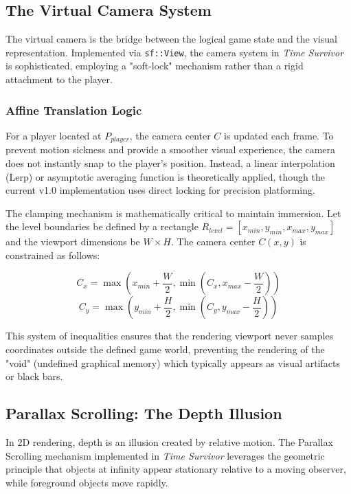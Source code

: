 \documentclass[10pt, a4paper]{article}
\begin{document}
\subsection{The Virtual Camera System}
The virtual camera is the bridge between the logical game state and the visual representation. Implemented via \texttt{sf::View}, the camera system in \textit{Time Survivor} is sophisticated, employing a "soft-lock" mechanism rather than a rigid attachment to the player.

\subsubsection{Affine Translation Logic}
For a player located at $P_{player}$, the camera center $C$ is updated each frame. To prevent motion sickness and provide a smoother visual experience, the camera does not instantly snap to the player's position. Instead, a linear interpolation (Lerp) or asymptotic averaging function is theoretically applied, though the current v1.0 implementation uses direct locking for precision platforming.

The clamping mechanism is mathematically critical to maintain immersion. Let the level boundaries be defined by a rectangle $R_{level} = [x_{min}, y_{min}, x_{max}, y_{max}]$ and the viewport dimensions be $W \times H$. The camera center $C(x, y)$ is constrained as follows:

\begin{equation}
C_x = \max \left( x_{min} + \frac{W}{2}, \min \left( C_x, x_{max} - \frac{W}{2} \right) \right)
\end{equation}
\begin{equation}
C_y = \max \left( y_{min} + \frac{H}{2}, \min \left( C_y, y_{max} - \frac{H}{2} \right) \right)
\end{equation}

This system of inequalities ensures that the rendering viewport never samples coordinates outside the defined game world, preventing the rendering of the "void" (undefined graphical memory) which typically appears as visual artifacts or black bars.

\subsection{Parallax Scrolling: The Depth Illusion}
In 2D rendering, depth is an illusion created by relative motion. The Parallax Scrolling mechanism implemented in \textit{Time Survivor} leverages the geometric principle that objects at infinity appear stationary relative to a moving observer, while foreground objects move rapidly.
\end{document}
